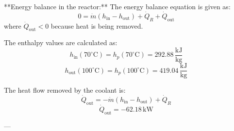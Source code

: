 **Energy balance in the reactor:**  
The energy balance equation is given as:  
\[
0 = \dot{m} \left( h_{\text{in}} - h_{\text{out}} \right) + \dot{Q}_R + \dot{Q}_{\text{out}}
\]  
where \( \dot{Q}_{\text{out}} < 0 \) because heat is being removed.  

The enthalpy values are calculated as:  
\[
h_{\text{in}}(70^\circ\text{C}) = h_p(70^\circ\text{C}) = 292.88 \, \frac{\text{kJ}}{\text{kg}}
\]  
\[
h_{\text{out}}(100^\circ\text{C}) = h_p(100^\circ\text{C}) = 419.04 \, \frac{\text{kJ}}{\text{kg}}
\]  

The heat flow removed by the coolant is:  
\[
\dot{Q}_{\text{out}} = -\dot{m} \left( h_{\text{in}} - h_{\text{out}} \right) + \dot{Q}_R
\]  
\[
\dot{Q}_{\text{out}} = -62.18 \, \text{kW}
\]  

---